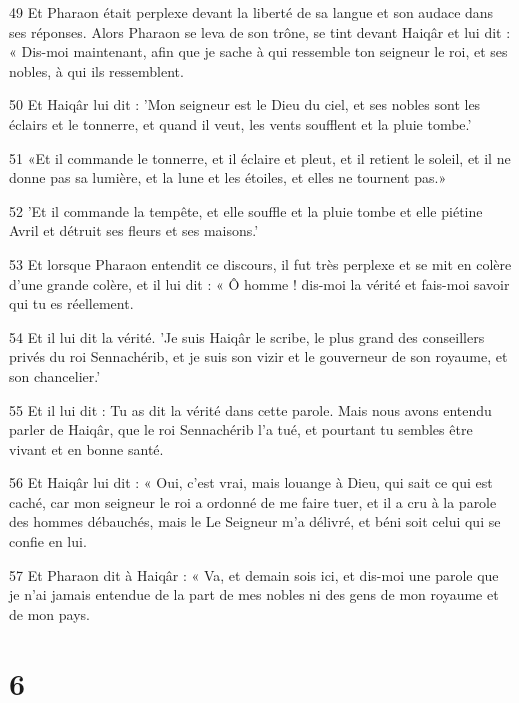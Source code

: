 \par 49 Et Pharaon était perplexe devant la liberté de sa langue et son audace dans ses réponses. Alors Pharaon se leva de son trône, se tint devant Haiqâr et lui dit : « Dis-moi maintenant, afin que je sache à qui ressemble ton seigneur le roi, et ses nobles, à qui ils ressemblent.

\par 50 Et Haiqâr lui dit : 'Mon seigneur est le Dieu du ciel, et ses nobles sont les éclairs et le tonnerre, et quand il veut, les vents soufflent et la pluie tombe.'

\par 51 «Et il commande le tonnerre, et il éclaire et pleut, et il retient le soleil, et il ne donne pas sa lumière, et la lune et les étoiles, et elles ne tournent pas.»

\par 52 'Et il commande la tempête, et elle souffle et la pluie tombe et elle piétine Avril et détruit ses fleurs et ses maisons.'

\par 53 Et lorsque Pharaon entendit ce discours, il fut très perplexe et se mit en colère d'une grande colère, et il lui dit : « Ô homme ! dis-moi la vérité et fais-moi savoir qui tu es réellement.

\par 54 Et il lui dit la vérité. 'Je suis Haiqâr le scribe, le plus grand des conseillers privés du roi Sennachérib, et je suis son vizir et le gouverneur de son royaume, et son chancelier.'

\par 55 Et il lui dit : Tu as dit la vérité dans cette parole. Mais nous avons entendu parler de Haiqâr, que le roi Sennachérib l'a tué, et pourtant tu sembles être vivant et en bonne santé.

\par 56 Et Haiqâr lui dit : « Oui, c'est vrai, mais louange à Dieu, qui sait ce qui est caché, car mon seigneur le roi a ordonné de me faire tuer, et il a cru à la parole des hommes débauchés, mais le Le Seigneur m'a délivré, et béni soit celui qui se confie en lui.

\par 57 Et Pharaon dit à Haiqâr : « Va, et demain sois ici, et dis-moi une parole que je n'ai jamais entendue de la part de mes nobles ni des gens de mon royaume et de mon pays.

\chapter{6}


